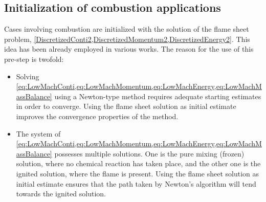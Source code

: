 \subsection{Initialization of combustion applications}
Cases involving combustion are initialized with the solution of the flame sheet problem, \cref{DiscretizedConti2,DiscretizedMomentum2,DiscretizedEnergy2}. This idea has been already employed in various works. \cite{smookeNumericalSolutionTwoDimensional1986,smookeNumericalModelingAxisymmetric1992} The reason for the use of this pre-step is twofold:
\begin{itemize}
	\item Solving \cref{eq:LowMachConti,eq:LowMachMomentum,eq:LowMachEnergy,eq:LowMachMassBalance} using a Newton-type method requires adequate starting estimates in order to converge. Using the flame sheet solution as initial estimate improves the convergence properties of the method.
	\item The system of  \cref*{eq:LowMachConti,eq:LowMachMomentum,eq:LowMachEnergy,eq:LowMachMassBalance} possesses multiple solutions. One is the pure mixing (frozen) solution, where no chemical reaction has taken place, and the other one is the ignited solution, where the flame is present. Using the flame sheet solution as initial estimate ensures that the path taken by Newton's algorithm will tend towards the ignited solution.
\end{itemize}

